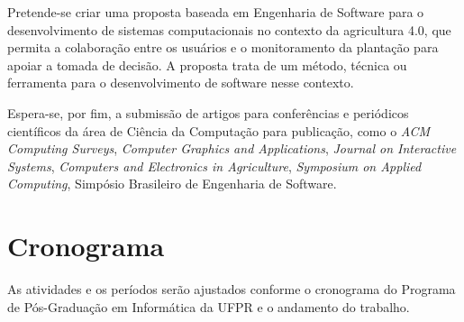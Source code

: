 \documentclass[12pt]{article}
\begin{document}
Pretende-se criar uma proposta baseada em Engenharia de Software para o desenvolvimento de sistemas computacionais no contexto da agricultura 4.0, que permita a colaboração entre os usuários e o monitoramento da plantação para apoiar a tomada de decisão. A proposta trata de um método, técnica ou ferramenta para o desenvolvimento de software nesse contexto.

Espera-se, por fim, a submissão de artigos para conferências e periódicos científicos da área de Ciência da Computação para publicação, como o \textit{ACM Computing Surveys}, \textit{Computer Graphics and Applications}, \textit{Journal on Interactive Systems}, \textit{Computers and Electronics in Agriculture}, \textit{Symposium on Applied Computing}, Simpósio Brasileiro de Engenharia de Software.

\section{Cronograma}
\label{sec:cronograma}

As atividades e os períodos serão ajustados conforme o cronograma do Programa de Pós-Graduação em Informática da UFPR e o andamento do trabalho.
\end{document}
